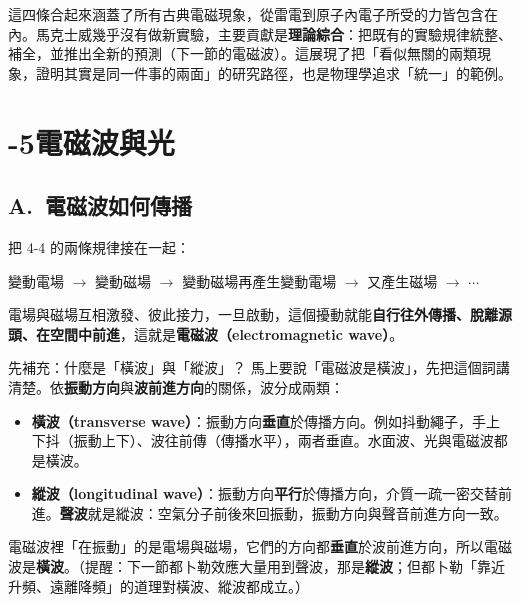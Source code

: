 \documentclass[11pt]{article}
\begin{document}
這四條合起來涵蓋了所有古典電磁現象，從雷電到原子內電子所受的力皆包含在內。馬克士威幾乎沒有做新實驗，主要貢獻是\textbf{理論綜合}：把既有的實驗規律統整、補全，並推出全新的預測（下一節的電磁波）。這展現了把「看似無關的兩類現象，證明其實是同一件事的兩面」的研究路徑，也是物理學追求「統一」的範例。

\section*{-5\quad 電磁波與光}

\subsection*{\sffamily A.\ 電磁波如何傳播}

把 4-4 的兩條規律接在一起：

\begin{center}
變動電場 $\rightarrow$ 變動磁場 $\rightarrow$ 變動磁場再產生變動電場 $\rightarrow$ 又產生磁場 $\rightarrow$ $\cdots$
\end{center}

電場與磁場互相激發、彼此接力，一旦啟動，這個擾動就能\textbf{自行往外傳播、脫離源頭、在空間中前進}，這就是\textbf{電磁波（electromagnetic wave）}。

\begin{補充框}{先補充：什麼是「橫波」與「縱波」？}
馬上要說「電磁波是橫波」，先把這個詞講清楚。依\textbf{振動方向}與\textbf{波前進方向}的關係，波分成兩類：

\begin{itemize}\setlength{\itemsep}{1pt}
\item \textbf{橫波（transverse wave）}：振動方向\textbf{垂直}於傳播方向。例如抖動繩子，手上下抖（振動上下）、波往前傳（傳播水平），兩者垂直。水面波、光與電磁波都是橫波。
\item \textbf{縱波（longitudinal wave）}：振動方向\textbf{平行}於傳播方向，介質一疏一密交替前進。\textbf{聲波}就是縱波：空氣分子前後來回振動，振動方向與聲音前進方向一致。
\end{itemize}

電磁波裡「在振動」的是電場與磁場，它們的方向都\textbf{垂直}於波前進方向，所以電磁波是\textbf{橫波}。（提醒：下一節都卜勒效應大量用到聲波，那是\textbf{縱波}；但都卜勒「靠近升頻、遠離降頻」的道理對橫波、縱波都成立。）
\end{補充框}

\end{document}
